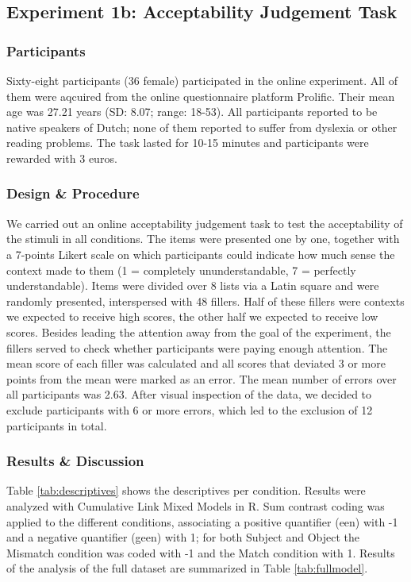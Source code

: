 \documentclass[11pt]{article} %
\begin{document}
\subsection{Experiment 1b: Acceptability Judgement Task}
\subsubsection{Participants}
Sixty-eight participants (36 female) participated in the online experiment. All of them were aqcuired from the online questionnaire platform Prolific. Their mean age was 27.21 years (SD: 8.07; range: 18-53). All participants reported to be native speakers of Dutch; none of them reported to suffer from dyslexia or other reading problems. The task lasted for 10-15 minutes and participants were rewarded with 3 euros.

\subsubsection{Design \& Procedure}
We carried out an online acceptability judgement task to test the acceptability of the stimuli in all conditions. The items were presented one by one, together with a 7-points Likert scale on which participants could indicate how much sense the context made to them (1 = completely ununderstandable, 7 = perfectly understandable). Items were divided over 8 lists via a Latin square and were randomly presented, interspersed with 48 fillers. Half of these fillers were contexts we expected to receive high scores, the other half we expected to receive low scores. Besides leading the attention away from the goal of the experiment, the fillers served to check whether participants were paying enough attention. The mean score of each filler was calculated and all scores that deviated 3 or more points from the mean were marked as an error. The mean number of errors over all participants was 2.63. After visual inspection of the data, we decided to exclude participants with 6 or more errors, which led to the exclusion of 12 participants in total.

\subsubsection{Results \& Discussion}
Table \ref{tab:descriptives} shows the descriptives per condition. Results were analyzed with Cumulative Link Mixed Models in R. Sum contrast coding was applied to the different conditions, associating a positive quantifier (een) with -1 and a negative quantifier (geen) with 1; for both Subject and Object the Mismatch condition was coded with -1 and the Match condition with 1. Results of the analysis of the full dataset are summarized in Table \ref{tab:fullmodel}. 
\end{document}
